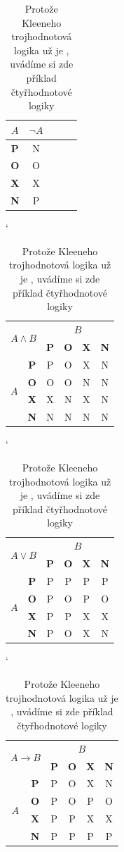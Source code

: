 \documentclass[a4paper, 11pt]{article}
\begin{document}
\begin{table}[h]
\begin{tabular}{|c|c|c|c|c}
\hline
    $A$ & $\neg A$ \\\hline
    \textbf{P} & N \\\hline
    \textbf{O} & O \\\hline
    \textbf{X} & X \\\hline
    \textbf{N} & P \\\hline

\end{tabular}
\catcode`
\begin{tabular}{|c|c|c|c|c|c|}
\hline
    \multicolumn{2}{|c|}{\multirow{2}{*}{$A \land B$}} & \multicolumn{4}{c|}{$B$} \\\cline{3-6}
     \multicolumn{2}{|c|}{} & \textbf{P} & \textbf{O} & \textbf{X} & \textbf{N} \\\hline
    \multirow{4}{*}{$A$} & \textbf{P} & P & O & X & N\\\cline{2-6}
    & \textbf{O} & O & O & N & N\\\cline{2-6}
    & \textbf{X} & X & N & X & N\\\cline{2-6}
    & \textbf{N} & N & N & N & N\\\hline

\end{tabular}
\catcode`
\begin{tabular}{|c|c|c|c|c|c|}
\hline
    \multicolumn{2}{|c|}{\multirow{2}{*}{$A \lor B$}} & \multicolumn{4}{c|}{$B$} \\\cline{3-6}
     \multicolumn{2}{|c|}{} & \textbf{P} & \textbf{O} & \textbf{X} & \textbf{N} \\\hline
    \multirow{4}{*}{$A$} & \textbf{P} & P & P & P & P\\\cline{2-6}
    & \textbf{O} & P & O & P & O\\\cline{2-6}
    & \textbf{X} & P & P & X & X\\\cline{2-6}
    & \textbf{N} & P & O & X & N\\\hline

\end{tabular}
\catcode`
\begin{tabular}{|c|c|c|c|c|c|}
\hline
    \multicolumn{2}{|c|}{\multirow{2}{*}{$A \to B$}} & \multicolumn{4}{c|}{$B$} \\\cline{3-6}
     \multicolumn{2}{|c|}{} & \textbf{P} & \textbf{O} & \textbf{X} & \textbf{N} \\\hline
    \multirow{4}{*}{$A$} & \textbf{P} & P & O & X & N\\\cline{2-6}
    & \textbf{O} & P & O & P & O\\\cline{2-6}
    & \textbf{X} & P & P & X & X\\\cline{2-6}
    & \textbf{N} & P & P & P & P\\\hline
\end{tabular}
\caption{Protože Kleeneho trojhodnotová logika už je , uvádíme si zde příklad čtyřhodnotové logiky}
\label{tab2}
\end{table}
\end{document}
